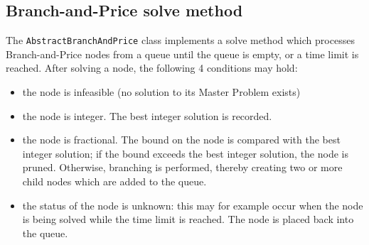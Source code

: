 \documentclass[a4paper]{article}
\newcommand{\code}[1]{\lstinline[language=java, style=seminar]!#1!}
\begin{document}
\subsection{Branch-and-Price solve method}
The \code{AbstractBranchAndPrice} class implements a solve method which processes Branch-and-Price nodes from a queue until the queue is empty, or a time limit is reached. After solving a node, the following 4 conditions may hold:
\begin{itemize}
 \item the node is infeasible (no solution to its Master Problem exists)
 \item the node is integer. The best integer solution is recorded.
 \item the node is fractional. The bound on the node is compared with the best integer solution; if the bound exceeds the best integer solution, the node is pruned. Otherwise, branching is performed, thereby creating two or more child nodes which are added to the queue.
 \item the status of the node is unknown: this may for example occur when the node is being solved while the time limit is reached. The node is placed back into the queue. 
\end{itemize}
\end{document}
